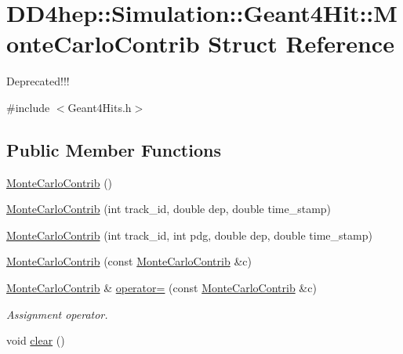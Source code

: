\hypertarget{struct_d_d4hep_1_1_simulation_1_1_geant4_hit_1_1_monte_carlo_contrib}{}\section{D\+D4hep\+:\+:Simulation\+:\+:Geant4\+Hit\+:\+:Monte\+Carlo\+Contrib Struct Reference}
\label{struct_d_d4hep_1_1_simulation_1_1_geant4_hit_1_1_monte_carlo_contrib}


Deprecated!!!  




{\ttfamily \#include $<$Geant4\+Hits.\+h$>$}

\subsection*{Public Member Functions}
\begin{DoxyCompactItemize}
\item 
\hyperlink{struct_d_d4hep_1_1_simulation_1_1_geant4_hit_1_1_monte_carlo_contrib_ade0fa203d957c85105826a23916ead5e}{Monte\+Carlo\+Contrib} ()
\item 
\hyperlink{struct_d_d4hep_1_1_simulation_1_1_geant4_hit_1_1_monte_carlo_contrib_a3f041eca3c402f2a8ba5fec12151e42f}{Monte\+Carlo\+Contrib} (int track\+\_\+id, double dep, double time\+\_\+stamp)
\item 
\hyperlink{struct_d_d4hep_1_1_simulation_1_1_geant4_hit_1_1_monte_carlo_contrib_af4908b6ddf6b878d9d529a5e614ca0de}{Monte\+Carlo\+Contrib} (int track\+\_\+id, int pdg, double dep, double time\+\_\+stamp)
\item 
\hyperlink{struct_d_d4hep_1_1_simulation_1_1_geant4_hit_1_1_monte_carlo_contrib_a13103caeeef9b6d184177690693f8f51}{Monte\+Carlo\+Contrib} (const \hyperlink{struct_d_d4hep_1_1_simulation_1_1_geant4_hit_1_1_monte_carlo_contrib}{Monte\+Carlo\+Contrib} \&c)
\item 
\hyperlink{struct_d_d4hep_1_1_simulation_1_1_geant4_hit_1_1_monte_carlo_contrib}{Monte\+Carlo\+Contrib} \& \hyperlink{struct_d_d4hep_1_1_simulation_1_1_geant4_hit_1_1_monte_carlo_contrib_a7cd8b1e9b2e5767d1bcfce6fa38a398c}{operator=} (const \hyperlink{struct_d_d4hep_1_1_simulation_1_1_geant4_hit_1_1_monte_carlo_contrib}{Monte\+Carlo\+Contrib} \&c)
\begin{DoxyCompactList}\small\item\em Assignment operator. \end{DoxyCompactList}\item 
void \hyperlink{struct_d_d4hep_1_1_simulation_1_1_geant4_hit_1_1_monte_carlo_contrib_a008953a5a8c03687349c791160d2c89e}{clear} ()
\end{DoxyCompactItemize}
